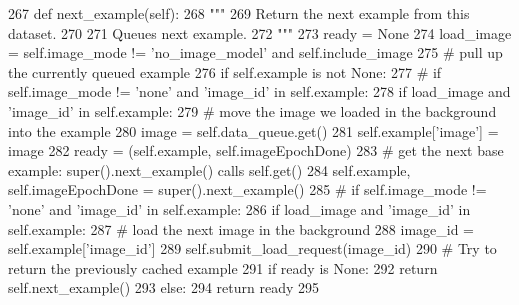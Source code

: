 \begin{DoxyCode}
267     \textcolor{keyword}{def }next\_example(self):
268         \textcolor{stringliteral}{"""}
269 \textcolor{stringliteral}{        Return the next example from this dataset.}
270 \textcolor{stringliteral}{}
271 \textcolor{stringliteral}{        Queues next example.}
272 \textcolor{stringliteral}{        """}
273         ready = \textcolor{keywordtype}{None}
274         load\_image = self.image\_mode != \textcolor{stringliteral}{'no\_image\_model'} \textcolor{keywordflow}{and} self.include\_image
275         \textcolor{comment}{# pull up the currently queued example}
276         \textcolor{keywordflow}{if} self.example \textcolor{keywordflow}{is} \textcolor{keywordflow}{not} \textcolor{keywordtype}{None}:
277             \textcolor{comment}{# if self.image\_mode != 'none' and 'image\_id' in self.example:}
278             \textcolor{keywordflow}{if} load\_image \textcolor{keywordflow}{and} \textcolor{stringliteral}{'image\_id'} \textcolor{keywordflow}{in} self.example:
279                 \textcolor{comment}{# move the image we loaded in the background into the example}
280                 image = self.data\_queue.get()
281                 self.example[\textcolor{stringliteral}{'image'}] = image
282             ready = (self.example, self.imageEpochDone)
283         \textcolor{comment}{# get the next base example: super().next\_example() calls self.get()}
284         self.example, self.imageEpochDone = super().next\_example()
285         \textcolor{comment}{# if self.image\_mode != 'none' and 'image\_id' in self.example:}
286         \textcolor{keywordflow}{if} load\_image \textcolor{keywordflow}{and} \textcolor{stringliteral}{'image\_id'} \textcolor{keywordflow}{in} self.example:
287             \textcolor{comment}{# load the next image in the background}
288             image\_id = self.example[\textcolor{stringliteral}{'image\_id'}]
289             self.submit\_load\_request(image\_id)
290         \textcolor{comment}{# Try to return the previously cached example}
291         \textcolor{keywordflow}{if} ready \textcolor{keywordflow}{is} \textcolor{keywordtype}{None}:
292             \textcolor{keywordflow}{return} self.next\_example()
293         \textcolor{keywordflow}{else}:
294             \textcolor{keywordflow}{return} ready
295 
\end{DoxyCode}
\mbox{\label{classparlai_1_1tasks_1_1personality__captions_1_1agents_1_1PersonalityCaptionsTeacher_a4d6d5ae65fc9d19ad7d847dbfd106427}} 
